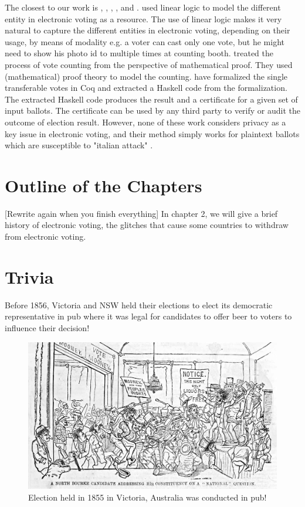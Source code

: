  The closest to our work is \cite{DeYoung:2012:LLV}, \cite{Pattinson:2015:VCM}, \cite{Pattinson:2016:MSP},
 \cite{Verity:2017:FVI:3014812.3014845}, and \cite{Ghale:2017:FVS}.  \cite{DeYoung:2012:LLV} 
 used linear logic\citep{GIRARD19871} to model the different entity in electronic voting as a resource. 
 The use of linear logic makes it very natural to capture the different entities in electronic voting,  
 depending on their usage, by means of modality e.g. a voter can cast only one vote, but he might 
 need to show his photo id to multiple times at counting booth. \cite{Pattinson:2015:VCM} treated 
 the process of vote counting from
 the perspective of mathematical proof. They used (mathematical) proof theory to model the 
 counting. \cite{Ghale:2017:FVS} have formalized the single transferable votes in Coq and 
 extracted a Haskell code from the formalization. The extracted Haskell code produces the result 
 and a certificate for a given set of input ballots. The certificate can be used by any third party to verify 
 or audit the outcome of election result.  However, none of these work considers privacy as a key 
 issue in electronic voting, and their method simply works for plaintext ballots which are  susceptible to 
 "italian attack"  \citep{Otten}   \citep{Benaloh:2009:SSC}.

\section{Outline of the Chapters}
[Rewrite again when you finish everything]
In chapter 2, we will give a brief history of electronic voting, the glitches that cause some countries 
to withdraw from electronic voting.  



\section{Trivia}
 Before 1856, Victoria and NSW held their elections to elect its 
	  democratic representative in pub where it was legal for 
	  candidates to offer beer to voters to influence their 
	  decision! 
	  
	   \begin{figure}[htb]
	\begin{center}
	\includegraphics[scale=0.25]{NorthBourke.jpg}
	\caption{Election held in 1855 in Victoria, Australia 
	  was conducted in pub!}
	\end{center}
  \end{figure}   
  
